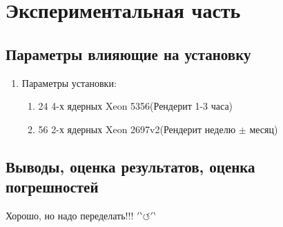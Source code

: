 \documentclass[a4paper,11pt]{article}
\begin{document}
\section{Экспериментальная часть}

\renewcommand{\thesubsection}{\arabic{subsection}}

\subsection{Параметры влияющие на установку}
\begin{enumerate}
    \item Параметры установки:\begin{enumerate}
        \item 24 4-х ядерных Xeon 5356(Рендерит 1-3 часа)
        \item 56 2-х ядерных Xeon 2697v2(Рендерит неделю $\pm$ месяц)
        \end{enumerate}
\end{enumerate}

\subsection{Выводы, оценка результатов, оценка погрешностей}
Хорошо, но надо переделать!!! $\prime \backprime\circlearrowleft \prime \backprime $ 
\renewcommand{\thesubsection}{\alph{subsection}}

\noindent



\noindent



\noindent


\end{document}
